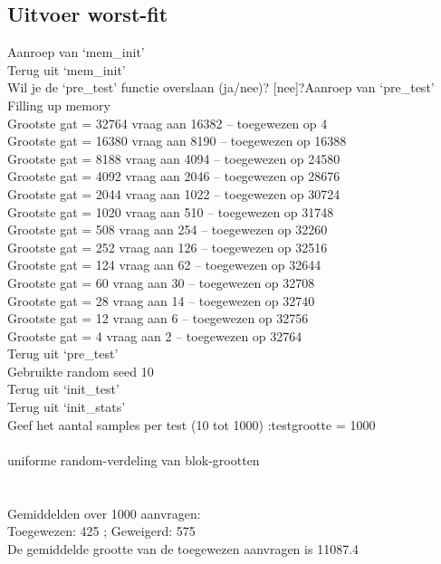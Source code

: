 \documentclass[a4paper]{article}
\begin{document}
\newpage

	\subsection{Uitvoer worst-fit}\label{sec:uitvoerwf}
Aanroep van `mem\_init'\\
Terug uit `mem\_init'\\
Wil je de `pre\_test' functie overslaan (ja/nee)? [nee]?Aanroep van `pre\_test'\\
Filling up memory\\
Grootste gat = 32764	 vraag aan 16382 -- toegewezen op 4\\
Grootste gat = 16380	 vraag aan 8190 -- toegewezen op 16388\\
Grootste gat = 8188	 vraag aan 4094 -- toegewezen op 24580\\
Grootste gat = 4092	 vraag aan 2046 -- toegewezen op 28676\\
Grootste gat = 2044	 vraag aan 1022 -- toegewezen op 30724\\
Grootste gat = 1020	 vraag aan 510 -- toegewezen op 31748\\
Grootste gat = 508	 vraag aan 254 -- toegewezen op 32260\\
Grootste gat = 252	 vraag aan 126 -- toegewezen op 32516\\
Grootste gat = 124	 vraag aan 62 -- toegewezen op 32644\\
Grootste gat = 60	 vraag aan 30 -- toegewezen op 32708\\
Grootste gat = 28	 vraag aan 14 -- toegewezen op 32740\\
Grootste gat = 12	 vraag aan 6 -- toegewezen op 32756\\
Grootste gat = 4	 vraag aan 2 -- toegewezen op 32764\\
Terug uit `pre\_test'\\
Gebruikte random seed 10\\
Terug uit `init\_test'\\
Terug uit `init\_stats'\\
Geef het aantal samples per test (10 tot 1000) :testgrootte = 1000\\
\\
uniforme random-verdeling van blok-grootten\\
\\
\\
Gemiddelden over 1000 aanvragen:\\
Toegewezen: 425 ; Geweigerd: 575\\
De gemiddelde grootte van de toegewezen aanvragen is 11087.4\\
\end{document}
